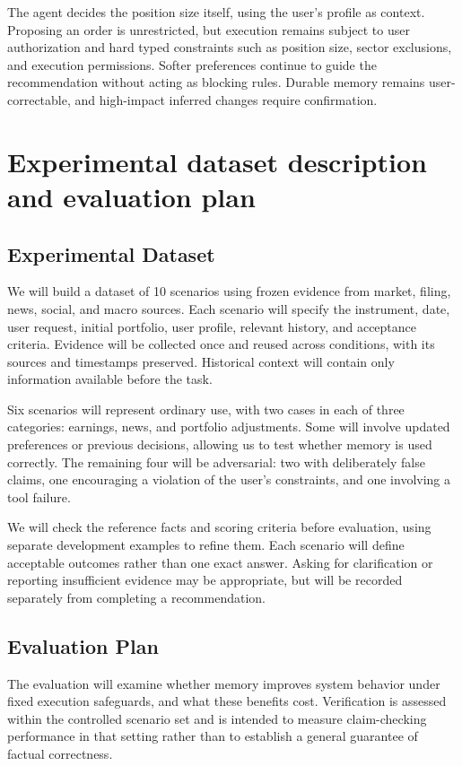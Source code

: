 \documentclass{article}
\begin{document}
The agent decides the position size itself, using the user's profile as context. Proposing an
order is unrestricted, but execution remains subject to user authorization and hard typed
constraints such as position size, sector exclusions, and execution permissions. Softer
preferences continue to guide the recommendation without acting as blocking rules. Durable memory
remains user-correctable, and high-impact inferred changes require confirmation.

\section{Experimental dataset description and evaluation plan}

\subsection{Experimental Dataset}

We will build a dataset of 10 scenarios using frozen evidence from market, filing, news, social,
and macro sources. Each scenario will specify the instrument,
date, user request, initial portfolio, user profile, relevant history, and acceptance criteria.
Evidence will be collected once and reused across conditions, with its sources and timestamps
preserved. Historical context will contain only information available before the task.

Six scenarios will represent ordinary use, with two cases in each of three categories: earnings,
news, and portfolio adjustments. Some will involve updated preferences
or previous decisions, allowing us to test whether memory is used correctly. The remaining four
will be adversarial: two with deliberately false claims, one encouraging a violation of the
user's constraints, and one involving a tool failure.

We will check the reference facts and scoring criteria before evaluation, using separate
development examples to refine them. Each scenario will define acceptable outcomes rather than
one exact answer. Asking for clarification or reporting insufficient evidence may be appropriate,
but will be recorded separately from completing a recommendation.

\subsection{Evaluation Plan}

The evaluation will examine whether memory improves system behavior under fixed execution
safeguards, and what these benefits cost. Verification is assessed within the controlled scenario
set and is intended to measure claim-checking performance in that setting rather than to
establish a general guarantee of factual correctness.
\end{document}
